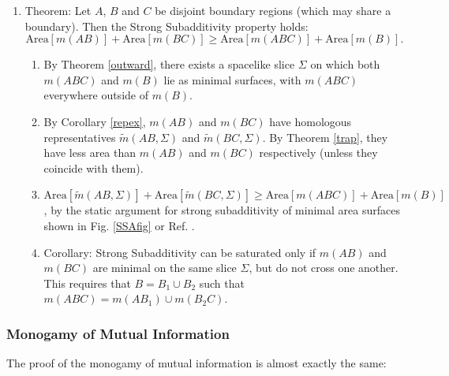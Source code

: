 \documentclass{article}
\begin{document}
\begin{enumerate}[resume]
\item \label{SSA} Theorem: Let $A$, $B$ and $C$ be disjoint boundary regions (which may share a boundary).  Then the Strong Subadditivity property holds:
\begin{equation}
\mathrm{Area}[m(AB)] + \mathrm{Area}[m(BC)] \ge \mathrm{Area}[m(ABC)] + \mathrm{Area}[m(B)].
\end{equation}
	\begin{enumerate}
	\item By Theorem \ref{outward}, there exists a spacelike slice $\Sigma$ on which both $m(ABC)$ and $m(B)$ lie as minimal surfaces, with $m(ABC)$ everywhere outside of $m(B)$.  
	\item By Corollary \ref{repex}, $m(AB)$ and $m(BC)$ have homologous representatives $\tilde{m}(AB,\Sigma)$ and $\tilde{m}(BC,\Sigma)$. By Theorem \ref{trap}, they have less area than $m(AB)$ and $m(BC)$ respectively (unless they coincide with them).
	\item $\mathrm{Area}[\tilde{m}(AB,\Sigma)] + \mathrm{Area}[\tilde{m}(BC,\Sigma)] \ge \mathrm{Area}[m(ABC)] + \mathrm{Area}[m(B)]$, by the static argument for strong subadditivity of minimal area surfaces shown in Fig. \ref{SSAfig} or Ref. \cite{HT07}.
	\item Corollary: Strong Subadditivity can be saturated only if $m(AB)$ and $m(BC)$ are minimal on the same slice $\Sigma$, but do not cross one another.  This requires that $B = B_1 \cup B_2$ such that $m(ABC) = m(AB_1) \cup m(B_2C)$.  
	\end{enumerate}
\end{enumerate}

\subsubsection{Monogamy of Mutual Information}\label{MONO}

The proof of the monogamy of mutual information is almost exactly the same:
\end{document}
